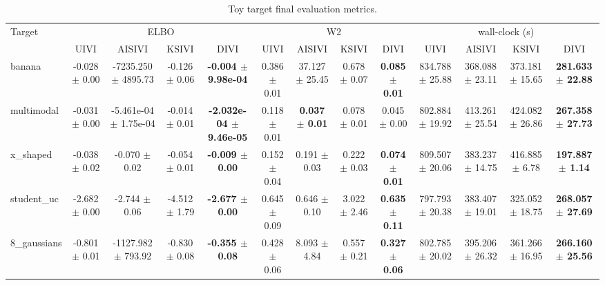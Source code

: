 \begin{table}[t]
\centering
\caption{Toy target final evaluation metrics.}
\label{tab:toy-final-eval}
\begin{tabular}{lcccccccccccc}
\toprule
Target & \multicolumn{4}{c}{ELBO} & \multicolumn{4}{c}{W2} & \multicolumn{4}{c}{wall-clock (s)} \\
 & UIVI & AISIVI & KSIVI & DIVI & UIVI & AISIVI & KSIVI & DIVI & UIVI & AISIVI & KSIVI & DIVI \\
\midrule
banana & -0.028 $\pm$ 0.00 & -7235.250 $\pm$ 4895.73 & -0.126 $\pm$ 0.06 & \textbf{-0.004 $\pm$ 9.98e-04} & 0.386 $\pm$ 0.01 & 37.127 $\pm$ 25.45 & 0.678 $\pm$ 0.07 & \textbf{0.085 $\pm$ 0.01} & 834.788 $\pm$ 25.88 & 368.088 $\pm$ 23.11 & 373.181 $\pm$ 15.65 & \textbf{281.633 $\pm$ 22.88} \\
multimodal & -0.031 $\pm$ 0.00 & -5.461e-04 $\pm$ 1.75e-04 & -0.014 $\pm$ 0.01 & \textbf{-2.032e-04 $\pm$ 9.46e-05} & 0.118 $\pm$ 0.01 & \textbf{0.037 $\pm$ 0.01} & 0.078 $\pm$ 0.01 & 0.045 $\pm$ 0.00 & 802.884 $\pm$ 19.92 & 413.261 $\pm$ 25.54 & 424.082 $\pm$ 26.86 & \textbf{267.358 $\pm$ 27.73} \\
x_shaped & -0.038 $\pm$ 0.02 & -0.070 $\pm$ 0.02 & -0.054 $\pm$ 0.01 & \textbf{-0.009 $\pm$ 0.00} & 0.152 $\pm$ 0.04 & 0.191 $\pm$ 0.03 & 0.222 $\pm$ 0.03 & \textbf{0.074 $\pm$ 0.01} & 809.507 $\pm$ 20.06 & 383.237 $\pm$ 14.75 & 416.885 $\pm$ 6.78 & \textbf{197.887 $\pm$ 1.14} \\
student_uc & -2.682 $\pm$ 0.00 & -2.744 $\pm$ 0.06 & -4.512 $\pm$ 1.79 & \textbf{-2.677 $\pm$ 0.00} & 0.645 $\pm$ 0.09 & 0.646 $\pm$ 0.10 & 3.022 $\pm$ 2.46 & \textbf{0.635 $\pm$ 0.11} & 797.793 $\pm$ 20.38 & 383.407 $\pm$ 19.01 & 325.052 $\pm$ 18.75 & \textbf{268.057 $\pm$ 27.69} \\
8_gaussians & -0.801 $\pm$ 0.01 & -1127.982 $\pm$ 793.92 & -0.830 $\pm$ 0.08 & \textbf{-0.355 $\pm$ 0.08} & 0.428 $\pm$ 0.06 & 8.093 $\pm$ 4.84 & 0.557 $\pm$ 0.21 & \textbf{0.327 $\pm$ 0.06} & 802.785 $\pm$ 20.02 & 395.206 $\pm$ 26.32 & 361.266 $\pm$ 16.95 & \textbf{266.160 $\pm$ 25.56} \\
\bottomrule
\end{tabular}
\end{table}
